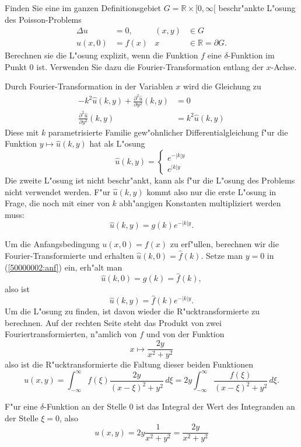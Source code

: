 Finden Sie eine im ganzen Definitionsgebiet 
$G=\mathbb R\times [0,\infty[$
beschr"ankte L"osung
des Poisson-Problems
\begin{align*}
\Delta u&=0,&(x,y)&\in G
\\
u(x,0)&=f(x)&x&\in\mathbb R=\partial G.
\end{align*}
Berechnen sie die L"osung explizit, wenn die Funktion $f$ eine
$\delta$-Funktion im Punkt $0$ ist. Verwenden Sie dazu die 
Fourier-Transformation entlang der $x$-Achse.

\begin{loesung}
Durch Fourier-Transformation in der Variablen $x$ wird die Gleichung
zu
\begin{align*}
-k^2\hat u(k,y)+\frac{\partial^2\hat u}{\partial y^2}(k,y)&=0\\
\frac{\partial^2\hat u}{\partial y^2}(k,y)&= k^2\hat u(k,y)
\end{align*}
Diese mit $k$ parametrisierte Familie gew"ohnlicher Differentialgleichung
f"ur die Funktion
$y\mapsto \hat u(k,y)$ hat als L"osung
\[
\hat u(k,y)=\begin{cases}
e^{-|k|y}\\
e^{|k|y}
\end{cases}
\]
Die zweite L"osung ist nicht beschr"ankt, kann als f"ur die L"osung
des Problems nicht verwendet werden. F"ur $\hat u(k,y)$ kommt also
nur die erste L"osung in Frage, die noch mit einer von $k$ abh"angigen
Konstanten multipliziert werden muss:
\begin{equation}
\hat u(k,y)=g(k)e^{-|k|y}.
\label{50000002:anf}
\end{equation}

Um die Anfangsbedingung $u(x,0)=f(x)$ zu erf"ullen, berechnen wir
die Fourier-Transformierte und erhalten $\hat u(k,0)=\hat f(k)$.
Setze man $y=0$ in (\ref{50000002:anf}) ein, erh"alt man
\[
\hat u(k,0)=g(k)=\hat f(k),
\]
also ist 
\[
\hat u(k,y)=\hat f(k)e^{-|k|y}.
\]
Um die L"osung zu finden, ist davon wieder die R"ucktransformierte
zu berechnen. Auf der rechten Seite steht das Produkt von zwei
Fouriertransformierten, n"amlich von $f$ und von der Funktion
\[
x\mapsto \frac{2y}{x^2+y^2}
\]
also ist die R"ucktransformierte die Faltung dieser beiden
Funktionen
\[
u(x,y)=\int_{-\infty}^\infty 
f(\xi) 
\frac{2y}{(x-\xi)^2+y^2}
\,d\xi
=
2y\int_{-\infty}^\infty\frac{f(\xi)}{(x-\xi)^2+y^2}\,d\xi.
\]

F"ur eine $\delta$-Funktion an der Stelle $0$ ist das Integral der
Wert des Integranden an der Stelle $\xi=0$, also
\[
u(x,y)=2y\frac{1}{x^2+y^2}=\frac{2y}{x^2+y^2}
\]


\end{loesung}
